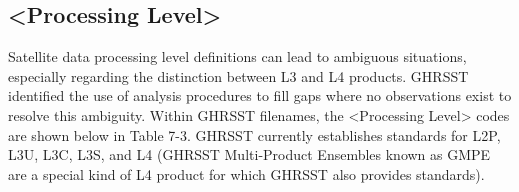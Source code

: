 \subsection{<Processing Level>}
Satellite data processing level definitions can lead to ambiguous situations, especially regarding the
distinction between L3 and L4 products. GHRSST identified the use of analysis procedures to fill gaps
where no observations exist to resolve this ambiguity. Within GHRSST filenames, the <Processing
Level> codes are shown below in Table 7-3. GHRSST currently establishes standards for L2P, L3U,
L3C, L3S, and L4 (GHRSST Multi-Product Ensembles known as GMPE are a special kind of L4
product for which GHRSST also provides standards). \par

